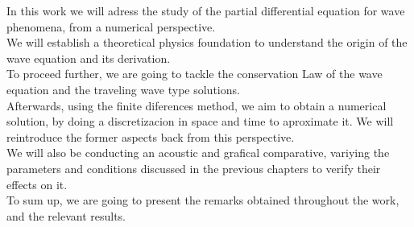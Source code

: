 

\begin{abstracts}

In this work we will adress the study of the partial differential equation for wave phenomena, from a numerical perspective.\\

We will establish a theoretical physics foundation to understand the origin of the wave equation and its derivation.\\


To proceed further, we are going to tackle the conservation Law of the wave equation and the traveling wave type solutions.\\

Afterwards, using the finite diferences method, we aim to obtain a numerical solution, by doing a discretizacion in space and time to aproximate it. We will reintroduce the former aspects back from this perspective.\\

We will also be conducting an acoustic and grafical comparative, variying the parameters and conditions discussed in the previous chapters to verify their effects on it.\\


To sum up, we are going to present the remarks obtained throughout the work, and the relevant results.


\end{abstracts}
